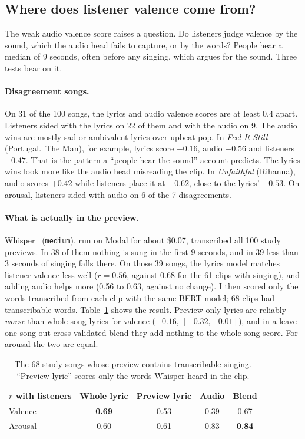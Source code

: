 \documentclass[10pt,twocolumn]{article}
\begin{document}
\subsection{Where does listener valence come from?}
\label{sec:valence}

The weak audio valence score raises a question. Do listeners judge valence by the sound, which the audio head fails to capture, or by the words? People hear a median of 9 seconds, often before any singing, which argues for the sound. Three tests bear on it.

\paragraph{Disagreement songs.} On 31 of the 100 songs, the lyrics and audio valence scores are at least 0.4 apart. Listeners sided with the lyrics on 22 of them and with the audio on 9. The audio wins are mostly sad or ambivalent lyrics over upbeat pop. In \emph{Feel It Still} (Portugal.\ The Man), for example, lyrics score $-0.16$, audio $+0.56$ and listeners $+0.47$. That is the pattern a ``people hear the sound'' account predicts. The lyrics wins look more like the audio head misreading the clip. In \emph{Unfaithful} (Rihanna), audio scores $+0.42$ while listeners place it at $-0.62$, close to the lyrics' $-0.53$. On arousal, listeners sided with audio on 6 of the 7 disagreements.

\paragraph{What is actually in the preview.} Whisper~\citep{radford2023whisper} (\texttt{medium}), run on Modal for about \$0.07, transcribed all 100 study previews. In 38 of them nothing is sung in the first 9 seconds, and in 39 less than 3 seconds of singing falls there. On those 39 songs, the lyrics model matches listener valence less well ($r=0.56$, against 0.68 for the 61 clips with singing), and adding audio helps more (0.56 to 0.63, against no change). I then scored only the words transcribed from each clip with the same BERT model; 68 clips had transcribable words. Table~\ref{tab:preview} shows the result. Preview-only lyrics are reliably \emph{worse} than whole-song lyrics for valence ($-0.16$, $[-0.32,-0.01]$), and in a leave-one-song-out cross-validated blend they add nothing to the whole-song score. For arousal the two are equal.

\begin{table}[t]
\centering\footnotesize
\setlength{\tabcolsep}{4pt}
\begin{tabular}{@{}lcccc@{}}
\toprule
$r$ with listeners & Whole lyric & Preview lyric & Audio & Blend\\
\midrule
Valence & \textbf{0.69} & 0.53 & 0.39 & 0.67\\
Arousal & 0.60 & 0.61 & 0.83 & \textbf{0.84}\\
\bottomrule
\end{tabular}
\caption{The 68 study songs whose preview contains transcribable singing. ``Preview lyric'' scores only the words Whisper heard in the clip.}
\label{tab:preview}
\end{table}
\end{document}
